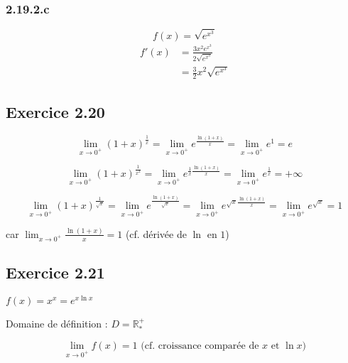 \documentclass{report}
\begin{document}
\subsubsection*{2.19.2.c}
\begin{displaymath}
	f(x) = \sqrt{e^{x^3}}
\end{displaymath}
\begin{equation*}
	\begin{split}
		f'(x) &= \frac{3x^2 e^{x^3}}{2\sqrt{e^{x^3}}} \\
		      &= \frac{3}{2}x^2 \sqrt{e^{x^3}}
	\end{split}	
\end{equation*}


\subsection*{Exercice 2.20}
\begin{displaymath}
	\lim_{x \rightarrow 0^{+}} (1+x)^\frac{1}{x}
		= \lim_{x \rightarrow 0^{+}} e^{\frac{\ln(1+x)}{x}}
		= \lim_{x \rightarrow 0^{+}} e^{1} 
		= e
\end{displaymath}

\begin{displaymath}
	\lim_{x \rightarrow 0^{+}} (1+x)^\frac{1}{x^2} 
		= \lim_{x \rightarrow 0^{+}} e^{\frac{1}{x}\frac{\ln(1+x)}{x}} 
		= \lim_{x \rightarrow 0^{+}} e^{\frac{1}{x}}
		= +\infty
\end{displaymath}

\begin{displaymath}
	\lim_{x \rightarrow 0^{+}} (1+x)^\frac{1}{\sqrt{x}} 
		= \lim_{x \rightarrow 0^{+}} e^{\frac{\ln(1+x)}{\sqrt{x}}} 
		= \lim_{x \rightarrow 0^{+}} e^{\sqrt{x}\frac{\ln(1+x)}{x}}
		= \lim_{x \rightarrow 0^{+}} e^{\sqrt{x}}
		= 1
\end{displaymath}

car $\lim_{x \rightarrow 0^{+}} \frac{\ln(1+x)}{x} = 1$ (cf. dérivée de $\ln$ en $1$)

\subsection*{Exercice 2.21}

$f(x) = x^x = e^{x \ln x}$

Domaine de définition : $D = \mathbb{R}^+_*$

\begin{displaymath}
	\lim_{x \rightarrow 0^{+}} f(x) = 1  \text{ (cf. croissance comparée de $x$ et $\ln x$)}
\end{displaymath}
\end{document}
